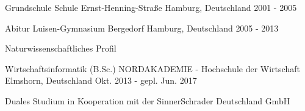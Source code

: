 

\begin{cventries}

  \cventry
    {Grundschule} %
    {Schule Ernst-Henning-Straße} %
    {Hamburg, Deutschland} %
    {2001 - 2005} %
    {}

  \cventry
    {Abitur} %
    {Luisen-Gymnasium Bergedorf} %
    {Hamburg, Deutschland} %
    {2005 - 2013} %
    {
      \begin{cvitems} %
        \item {Naturwissenschaftliches Profil}
      \end{cvitems}
    }

  \cventry
    {Wirtschaftsinformatik (B.Sc.)} %
    {NORDAKADEMIE - Hochschule der Wirtschaft} %
    {Elmshorn, Deutschland} %
    {Okt. 2013 - gepl. Jun. 2017} %
    {
      \begin{cvitems} %
        \item {Duales Studium in Kooperation mit der SinnerSchrader Deutschland GmbH}
      \end{cvitems}
    }

\end{cventries}
